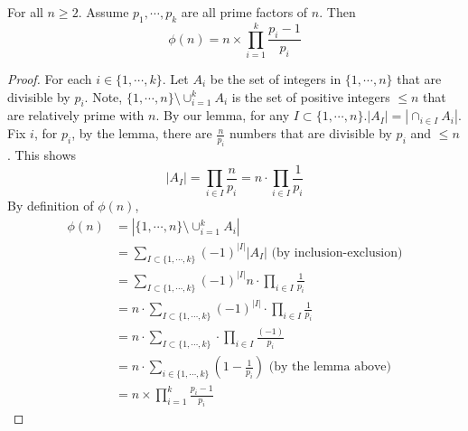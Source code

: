\begin{theorem}
    For all $n \geq 2$. Assume $p_1, \cdots,p_k$ are all prime factors of $n$. Then
    $$\phi(n)=n \times \prod_{i=1}^k \frac{p_i-1}{p_i}$$
\end{theorem}
\begin{proof}
    For each $i \in \{1,\cdots,k\}$. Let $A_i$ be the set of integers in $\{1,\cdots,n\}$ that are divisible by $p_i$. 
    Note, $\{1,\cdots,n\}\setminus \cup_{i=1}^kA_i$ is the set of positive integers $\leq n$ that are relatively prime with $n$. 
    By our lemma, for any $I \subset \{1,\cdots,n\}. |A_I|=|\cap_{i \in I}A_i|$. 
    Fix $i$, for $p_i$, by the lemma, there are $\frac{n}{p_i}$ numbers that are divisible by $p_i$ and $\leq n$. 
    This shows $$|A_I|=\prod_{i \in I}\frac{n}{p_i}=n \cdot \prod_{i \in I}\frac{1}{p_i}$$
    By definition of $\phi(n)$,
    \begin{equation}
        \begin{split}
            \phi(n) &= |\{1,\cdots,n\}\setminus \cup_{i=1}^kA_i|\\
            &= \sum_{I \subset \{1,\cdots,k\}}(-1)^{|I|}|A_I| \text{ (by inclusion-exclusion)}\\
            &= \sum_{I \subset \{1,\cdots,k\}}(-1)^{|I|}n \cdot \prod_{i \in I}\frac{1}{p_i}\\
            &= n \cdot \sum_{I \subset \{1,\cdots,k\}}(-1)^{|I|} \cdot \prod_{i \in I}\frac{1}{p_i}\\
            &= n \cdot \sum_{I \subset \{1,\cdots,k\}}\cdot \prod_{i \in I}\frac{(-1)}{p_i}\\
            &= n \cdot \sum_{i \in \{1,\cdots,k\}}(1-\frac{1}{p_i}) \text{ (by the lemma above)}\\
            &= n \times \prod_{i=1}^k \frac{p_i-1}{p_i}
        \end{split}
    \end{equation}
\end{proof}